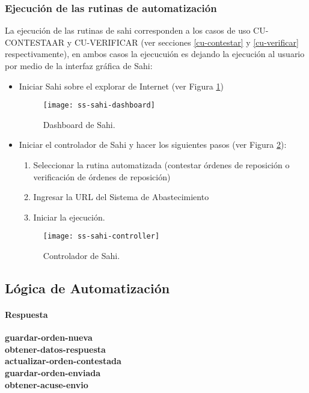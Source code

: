 \subsubsection{Ejecución de las rutinas de automatización}
La ejecución de las rutinas de sahi corresponden a los casos de uso CU-CONTESTAAR y 
CU-VERIFICAR (ver secciones \ref{cu-contestar} y \ref{cu-verificar} respectivamente), en ambos casos la ejecucuión es  
dejando la ejecución al usuario por medio de la interfaz gráfica de Sahi:
\begin{itemize}
	\item Iniciar Sahi sobre el explorar de Internet (ver Figura \ref{fig:ss-sahi-dashboard})
	\begin{figure}[h]
	\centering
	\texttt{[image: ss-sahi-dashboard]}
	\caption{Dashboard de Sahi.}
	\label{fig:ss-sahi-dashboard}
	\end{figure}

	\item Iniciar el controlador de Sahi y hacer los siguientes pasos (ver Figura \ref{fig:ss-sahi-controller}):
	\begin{enumerate}
		\item Seleccionar la rutina automatizada (contestar órdenes de reposición o verificación de órdenes de reposición)
		\item Ingresar la URL del Sistema de Abastecimiento
		\item Iniciar la ejecución.
	\end{enumerate}
	\begin{figure}[h]
	\centering
	\texttt{[image: ss-sahi-controller]}
	\caption{Controlador de Sahi.}
	\label{fig:ss-sahi-controller}
	\end{figure}
\end{itemize}





\subsection{Lógica de Automatización}
	\paragraph{Respuesta\\}
		\textbf{guardar-orden-nueva}\\
		\textbf{obtener-datos-respuesta}\\
		\textbf{actualizar-orden-contestada}\\
		\textbf{guardar-orden-enviada}\\
		\textbf{obtener-acuse-envio}
